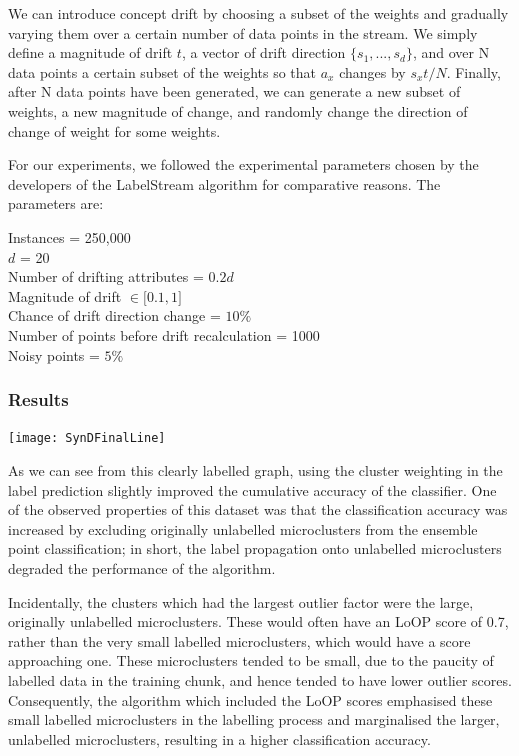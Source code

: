 \documentclass[12pt,a4paper,oneside]{report}
\begin{document}
We can introduce concept drift by choosing a subset of the weights and gradually varying them over a certain number of data points in the stream. We simply define a magnitude of drift \(t\), a vector of drift direction  \( \lbrace s_1,...,s_d  \rbrace \), and over N data points a certain subset of the weights so that \( a_x \) changes by \(  s_xt / N \). Finally, after N data points have been generated, we can generate a new subset of weights, a new magnitude of change, and randomly change the direction of change of weight for some weights.

For our experiments, we followed the experimental parameters chosen by the developers of the LabelStream algorithm for comparative reasons. The parameters are:

Instances = 250,000\\
\(d\) = 20 \\
Number of drifting attributes = \(0.2d\)\\
Magnitude of drift \(\in \lbrack 0.1,1\rbrack \) \\
Chance of drift direction change = \(10 \% \) \\
Number of points before drift recalculation  = 1000\\
Noisy points = \(5\% \)
\subsubsection{Results}

\texttt{[image: SynDFinalLine]}

As we can see from this clearly labelled graph, using the cluster weighting in the label prediction slightly improved the cumulative accuracy of the classifier.  One of the observed properties of this dataset was that the classification accuracy was increased by excluding originally unlabelled microclusters from the ensemble point classification; in short, the label propagation onto unlabelled microclusters degraded the performance of the algorithm. 

Incidentally, the clusters which had the largest outlier factor were the large, originally unlabelled microclusters. These would often have an LoOP score of 0.7, rather than the very small labelled microclusters, which would have a score approaching one. These microclusters tended to be small, due to the paucity of labelled data in the training chunk, and hence tended to have lower outlier scores. Consequently, the algorithm which included the LoOP scores emphasised these small labelled microclusters in the labelling process and marginalised the larger, unlabelled microclusters, resulting in a higher classification accuracy. 
\end{document}
